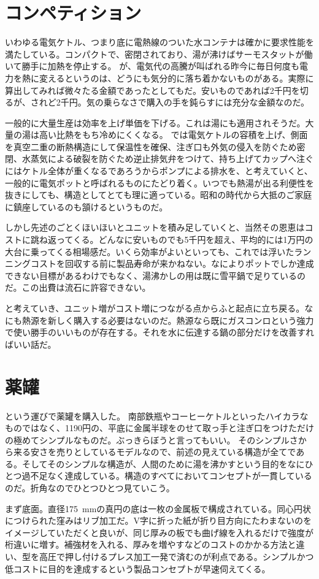 \documentclass{sokuten}
\begin{document}
\section{コンペティション}
いわゆる電気ケトル、つまり底に電熱線のついた水コンテナは確かに要求性能を満たしている。コンパクトで、密閉されており、湯が沸けばサーモスタットが働いて勝手に加熱を停止する。
が、電気代の高騰が叫ばれる昨今に毎日何度も電力を熱に変えるというのは、どうにも気分的に落ち着かないものがある。実際に算出してみれば微々たる金額であったとしてもだ。安いものであれば2千円を切るが、されど2千円。気の乗らなさで購入の手を鈍らすには充分な金額なのだ。

一般的に大量生産は効率を上げ単価を下げる。これは湯にも適用されそうだ。大量の湯は高い比熱をもち冷めにくくなる。
では電気ケトルの容積を上げ、側面を真空二重の断熱構造にして保温性を確保、注ぎ口も外気の侵入を防ぐため密閉、水蒸気による破裂を防ぐため逆止排気弁をつけて、持ち上げてカップへ注ぐにはケトル全体が重くなるであろうからポンプによる排水を、と考えていくと、一般的に電気ポットと呼ばれるものにたどり着く。いつでも熱湯が出る利便性を抜きにしても、構造としてとても理に適っている。昭和の時代から大抵のご家庭に鎮座しているのも頷けるというものだ。

しかし先述のごとくほいほいとユニットを積み足していくと、当然その恩恵はコストに跳ね返ってくる。どんなに安いものでも5千円を超え、平均的には1万円の大台に乗ってくる相場感だ。いくら効率がよいといっても、これでは浮いたランニングコストを回収する前に製品寿命が来かねない。なによりポットでしか達成できない目標があるわけでもなく、湯沸かしの用は既に雪平鍋で足りているのだ。この出費は流石に許容できない。

と考えていき、ユニット増がコスト増につながる点からふと起点に立ち戻る。なにも熱源を新しく購入する必要はないのだ。熱源なら既にガスコンロという強力で使い勝手のいいものが存在する。それを水に伝達する鍋の部分だけを改善すればいい話だ。
\section{薬罐}
という運びで薬罐を購入した。
南部鉄瓶やコーヒーケトルといったハイカラなものではなく、\num{1190}円の、平底に金属半球をのせて取っ手と注ぎ口をつけただけの極めてシンプルなものだ。ぶっきらぼうと言ってもいい。
そのシンプルさから来る安さを売りとしているモデルなので、前述の見えている構造が全てである。そしてそのシンプルな構造が、人間のために湯を沸かすという目的をなにひとつ過不足なく達成している。構造のすべてにおいてコンセプトが一貫しているのだ。折角なのでひとつひとつ見ていこう。

まず底面。直径\SI{175}{mm}の真円の底は一枚の金属板で構成されている。同心円状につけられた窪みはリブ加工だ。V字に折った紙が折り目方向にたわまないのをイメージしていただくと良いが、同じ厚みの板でも曲げ線を入れるだけで強度が桁違いに増す。補強材を入れる、厚みを増やすなどのコストのかかる方法と違い、型を高圧で押し付けるプレス加工一発で済むのが利点である。シンプルかつ低コストに目的を達成するという製品コンセプトが早速伺えてくる。
\end{document}
